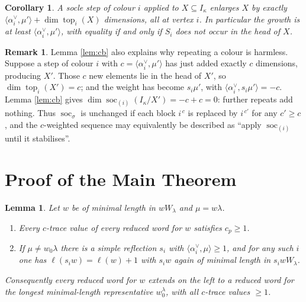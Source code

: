 \documentclass[11pt,reqno]{amsart}
\theoremstyle{plain}
\newtheorem{lemma}[theorem]{Lemma}
\newtheorem{corollary}[theorem]{Corollary}
\theoremstyle{definition}
\newtheorem{remark}[theorem]{Remark}
\DeclareMathOperator{\soc}{soc}
\DeclareMathOperator{\topp}{top}
\newcommand{\al}{\alpha}
\newcommand{\la}{\lambda}
\newcommand{\ka}{\kappa}
\begin{document}
\begin{corollary}\label{cor:mono}
A socle step of colour $i$ applied to $X\subseteq I_\ka$ enlarges $X$ by
exactly $\langle\al_i^\vee,\mu'\rangle+\dim\topp_i(X)$ dimensions, all at
vertex $i$.  In particular the growth is at least
$\langle\al_i^\vee,\mu'\rangle$, with equality if and only if $S_i$ does not
occur in the head of $X$.
\end{corollary}

\begin{remark}\label{rem:repeats}
Lemma \ref{lem:cb} also explains why repeating a colour is harmless.  Suppose a
step of colour $i$ with $c=\langle\al_i^\vee,\mu'\rangle$ has just added
exactly $c$ dimensions, producing $X'$.  Those $c$ new elements lie in the head
of $X'$, so $\dim\topp_i(X')=c$; and the weight has become
$s_i\mu'$, with $\langle\al_i^\vee,s_i\mu'\rangle=-c$.  Lemma \ref{lem:cb}
gives $\dim\soc_{(i)}(I_\ka/X')=-c+c=0$: further repeats add nothing.  Thus
$\soc_\sigma$ is unchanged if each block $i^{\,c}$ is replaced by $i^{\,c'}$
for any $c'\ge c$, and the $c$-weighted sequence may equivalently be described
as ``apply $\soc_{(i)}$ until it stabilises''.
\end{remark}

\section{Proof of the Main Theorem}\label{sec:proof}

\begin{lemma}\label{lem:extend}
Let $w$ be of minimal length in $wW_\la$ and $\mu=w\la$.
\begin{enumerate}
\item[(i)] Every $c$-trace value of every reduced word for $w$ satisfies
$c_p\ge1$.
\item[(ii)] If $\mu\ne w_0\la$ there is a simple reflection $s_i$ with
$\langle\al_i^\vee,\mu\rangle\ge1$, and for any such $i$ one has
$\ell(s_iw)=\ell(w)+1$ with $s_iw$ again of minimal length in $s_iwW_\la$.
\end{enumerate}
Consequently every reduced word for $w$ extends on the left to a reduced word
for the longest minimal-length representative $w_0^\la$, with all $c$-trace
values $\ge1$.
\end{lemma}
\end{document}
